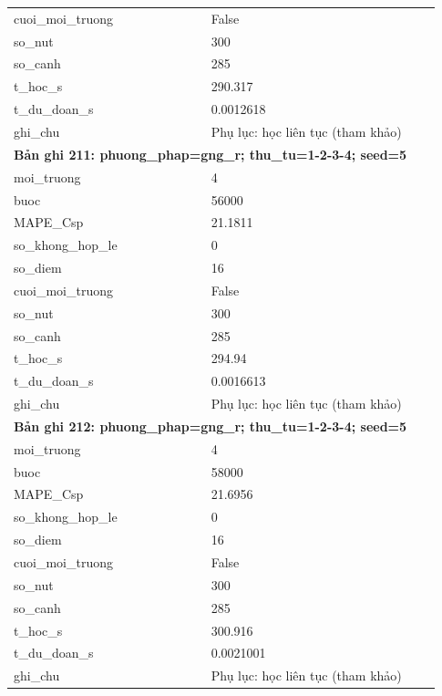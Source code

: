 \begin{longtable}{p{0.43\linewidth}p{0.50\linewidth}}
cuoi\_\allowbreak moi\_\allowbreak truong & False \\
so\_\allowbreak nut & 300 \\
so\_\allowbreak canh & 285 \\
t\_\allowbreak hoc\_\allowbreak s & 290.317 \\
t\_\allowbreak du\_\allowbreak doan\_\allowbreak s & 0.0012618 \\
ghi\_\allowbreak chu & Phụ lục: học liên tục (tham khảo) \\
\midrule
\multicolumn{2}{p{0.95\linewidth}}{\textbf{Bản ghi 211: phuong\_phap=gng\_r; thu\_tu=1-2-3-4; seed=5}} \\
moi\_\allowbreak truong & 4 \\
buoc & 56000 \\
MAPE\_\allowbreak Csp & 21.1811 \\
so\_\allowbreak khong\_\allowbreak hop\_\allowbreak le & 0 \\
so\_\allowbreak diem & 16 \\
cuoi\_\allowbreak moi\_\allowbreak truong & False \\
so\_\allowbreak nut & 300 \\
so\_\allowbreak canh & 285 \\
t\_\allowbreak hoc\_\allowbreak s & 294.94 \\
t\_\allowbreak du\_\allowbreak doan\_\allowbreak s & 0.0016613 \\
ghi\_\allowbreak chu & Phụ lục: học liên tục (tham khảo) \\
\midrule
\multicolumn{2}{p{0.95\linewidth}}{\textbf{Bản ghi 212: phuong\_phap=gng\_r; thu\_tu=1-2-3-4; seed=5}} \\
moi\_\allowbreak truong & 4 \\
buoc & 58000 \\
MAPE\_\allowbreak Csp & 21.6956 \\
so\_\allowbreak khong\_\allowbreak hop\_\allowbreak le & 0 \\
so\_\allowbreak diem & 16 \\
cuoi\_\allowbreak moi\_\allowbreak truong & False \\
so\_\allowbreak nut & 300 \\
so\_\allowbreak canh & 285 \\
t\_\allowbreak hoc\_\allowbreak s & 300.916 \\
t\_\allowbreak du\_\allowbreak doan\_\allowbreak s & 0.0021001 \\
ghi\_\allowbreak chu & Phụ lục: học liên tục (tham khảo) \\

\end{longtable}
